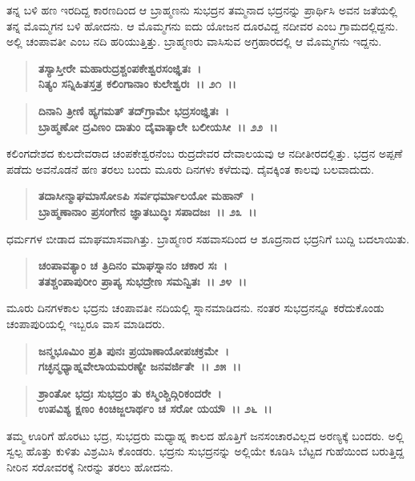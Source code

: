 ತನ್ನ ಬಳಿ ಹಣ ಇರದಿದ್ದ ಕಾರಣದಿಂದ ಆ ಬ್ರಾಹ್ಮಣನು ಸುಭದ್ರನ ತಮ್ಮನಾದ ಭದ್ರನನ್ನು ಪ್ರಾರ್ಥಿಸಿ ಅವನ ಜತೆಯಲ್ಲಿ ತನ್ನ ಮೊಮ್ಮಗನ ಬಳಿ ಹೋದನು. ಆ ಮೊಮ್ಮಗನು ಐದು ಯೋಜನ ದೂರವಿದ್ದ ನದೀವರ ಎಂಬ ಗ್ರಾಮದಲ್ಲಿದ್ದನು. ಅಲ್ಲಿ ಚಂಪಾವತೀ ಎಂಬ ನದಿ ಹರಿಯುತ್ತಿತ್ತು. ಬ್ರಾಹ್ಮಣರು ವಾಸಿಸುವ ಅಗ್ರಹಾರದಲ್ಲಿ ಆ ಮೊಮ್ಮಗನು ಇದ್ದನು.

\begin{verse}
\textbf{ತಸ್ಯಾಸ್ತೀರೇ ಮಹಾರುದ್ರಶ್ಚಂಪಕೇಶ್ವರಸಂಜ್ಞಿತಃ~।}\\\textbf{ನಿತ್ಯಂ ಸನ್ನಿಹಿತಸ್ತತ್ರ ಕಲಿಂಗಾನಾಂ ಕುಲೇಶ್ವರಃ~।। ೨೧~।। }
\end{verse}

\begin{verse}
\textbf{ದಿನಾನಿ ತ್ರೀಣಿ ಹ್ಯಗಮತ್ ತದ್‌ಗ್ರಾಮೇ ಭದ್ರಸಂಜ್ಞಿತಃ~।}\\\textbf{ಬ್ರಾಹ್ಮಣೋ ದ್ರವಿಣಂ ದಾತುಂ ದೈವಾತ್ಕಾಲೇ ಬಲೀಯಸೀ~।। ೨೨~।।}
\end{verse}

ಕಲಿಂಗದೇಶದ ಕುಲದೇವರಾದ ಚಂಪಕೇಶ್ವರನೆಂಬ ರುದ್ರದೇವರ ದೇವಾಲಯವು ಆ ನದೀತೀರದಲ್ಲಿತ್ತು. ಭದ್ರನ ಅಪ್ಪಣೆ ಪಡೆದು ಅವನೊಡನೆ ಹಣ ತರಲು ಬಂದು ಮೂರು ದಿನಗಳು ಕಳೆದುವು. ದೈವಕ್ಕಿಂತ ಕಾಲವು ಬಲವಾದುದು.

\begin{verse}
\textbf{ತದಾಸೀನ್ಮಾಘಮಾಸೋಽಪಿ ಸರ್ವಧರ್ಮಾಲಯೋ ಮಹಾನ್~।}\\\textbf{ಬ್ರಾಹ್ಮಣಾನಾಂ ಪ್ರಸಂಗೇನ ಜ್ಞಾತಬುದ್ಧಿಃ ಸಪಾದಜಃ~।। ೨೩~।।}
\end{verse}

ಧರ್ಮಗಳ ಬೀಡಾದ ಮಾಘಮಾಸವಾಗಿತ್ತು. ಬ್ರಾಹ್ಮಣರ ಸಹವಾಸದಿಂದ ಆ ಶೂದ್ರನಾದ ಭದ್ರನಿಗೆ ಬುದ್ದಿ ಬದಲಾಯಿತು.

\begin{verse}
\textbf{ಚಂಪಾವತ್ಯಾಂ ಚ ತ್ರಿದಿನಂ ಮಾಘಸ್ನಾನಂ ಚಕಾರ ಸಃ~।}\\\textbf{ತತಶ್ಚಂಪಾಪುರೀಂ ಪ್ರಾಪ್ಯ ಸುಭದ್ರೇಣ ಸಮನ್ವಿತಃ~।। ೨೪~।।}
\end{verse}

ಮೂರು ದಿನಗಳಕಾಲ ಭದ್ರನು ಚಂಪಾವತೀ ನದಿಯಲ್ಲಿ ಸ್ನಾನಮಾಡಿದನು. ನಂತರ ಸುಭದ್ರನನ್ನೂ ಕರೆದುಕೊಂಡು ಚಂಪಾಪುರಿಯಲ್ಲಿ ಇಬ್ಬರೂ ವಾಸ ಮಾಡಿದರು.

\begin{verse}
\textbf{ಜನ್ಮಭೂಮಿಂ ಪ್ರತಿ ಪುನಃ ಪ್ರಯಾಣಾಯೋಪಚಕ್ರಮೇ~।}\\\textbf{ಗಚ್ಛನ್ಮಧ್ಯಾಹ್ನವೇಲಾಯಮರಣ್ಯೇ ಜನವರ್ಜಿತೇ~।। ೨೫~।। }
\end{verse}

\begin{verse}
\textbf{ಶ್ರಾಂತೋ ಭದ್ರಃ ಸುಭದ್ರಂ ತು ಕಸ್ಮಿಂಶ್ಚಿದ್ಗಿರಿಕಂದರೇ~।}\\\textbf{ಉಪವಿಶ್ಯ ಕ್ಷಣಂ ಕಿಂಚಿಜ್ಜಲಾರ್ಥಂ ಚ ಸರೋ ಯಯೌ~।। ೨೬~।।}
\end{verse}

ತಮ್ಮ ಊರಿಗೆ ಹೊರಟು ಭದ್ರ, ಸುಭದ್ರರು ಮಧ್ಯಾಹ್ನ ಕಾಲದ ಹೊತ್ತಿಗೆ ಜನಸಂಚಾರವಿಲ್ಲದ ಅರಣ್ಯಕ್ಕೆ ಬಂದರು. ಅಲ್ಲಿ ಸ್ವಲ್ಪ ಹೊತ್ತು ಕುಳಿತು ವಿಶ್ರಮಿಸಿ ಕೊಂಡರು. ಭದ್ರನು ಸುಭದ್ರನನ್ನು ಅಲ್ಲಿಯೇ ಕೂಡಿಸಿ ಬೆಟ್ಟದ ಗುಹೆಯಿಂದ ಬರುತ್ತಿದ್ದ ನೀರಿನ ಸರೋವರಕ್ಕೆ ನೀರನ್ನು ತರಲು ಹೋದನು.


